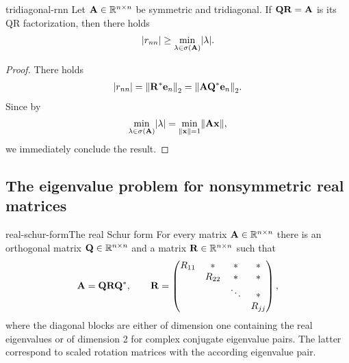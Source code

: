 \begin{Lemma}{tridiagonal-rnn}
  Let $\mathbf A\in\mathbb R^{n\times n}$ be symmetric and tridiagonal. If
  $\mathbf Q\mathbf R=\mathbf A$ is its QR factorization, then there holds
  \begin{gather}
    \lvert r_{nn}\rvert \ge \min_{\lambda\in\sigma(\mathbf A)} \lvert\lambda\rvert.
  \end{gather}
\end{Lemma}

\begin{proof}
  There holds
  \begin{gather}
    \abs*{r_{nn}} = \norm*{\matr^*\ve_n}_2 = \norm*{\mata\matq^*\ve_n}_2.
  \end{gather}
  Since by 
  \begin{gather}
    \min_{\lambda\in\sigma(\mata)}\abs*{\lambda}
    = \min_{\norm{\vx}=1} \norm{\mata\vx},
  \end{gather}
  we immediately conclude the result.
\end{proof}
  
\subsection{The eigenvalue problem for nonsymmetric real matrices}

\begin{Theorem*}{real-schur-form}{The real Schur form}
  For every matrix $\mathbf A\in \mathbb R^{n\times n}$ there is an orthogonal matrix
  $\mathbf Q\in\mathbb R^{n\times n}$ and a matrix $\mathbf R\in\mathbb R^{n\times n}$ such that
  \begin{gather}
    \mathbf A = \mathbf Q\mathbf R\mathbf Q^*,
    \qquad
    \mathbf R =
    \begin{pmatrix}
      R_{11} &* & *&*\\
      &R_{22}&*&*\\
      &&\ddots&*\\
      &&& R_{jj}
    \end{pmatrix},
  \end{gather}
  where the diagonal blocks are either of dimension one containing the
  real eigenvalues or of dimension 2 for complex conjugate eigenvalue
  pairs. The latter correspond to scaled rotation matrices with the
  according eigenvalue pair.
\end{Theorem*}

